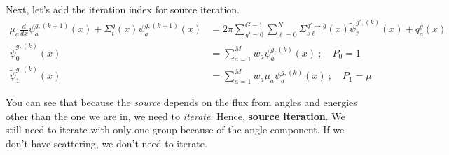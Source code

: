 \documentclass[12pt]{article}
\begin{document}
Next, let's add the iteration index for source iteration.  
\begin{align}
\mu_a \frac{d}{dx}\psi_{a}^{g, (k+1)}(x) + \Sigma_{t}^g(x) \psi_{a}^{g, (k+1)}(x) &= 2\pi \sum_{g'=0}^{G-1}
  \sum_{\ell=0}^N \Sigma_{s\ell}^{g'\rightarrow g}(x) \tilde{\psi}^{g', (k)}_\ell(x) + q_{a}^g(x)\\
\tilde{\psi}^{g, (k)}_0(x) &= \sum_{a=1}^M w_a \psi_a^{g, (k)}(x)\:; \quad P_0 = 1\\
\tilde{\psi}^{g, (k)}_1(x) &= \sum_{a=1}^M w_a \mu_a \psi_a^{g, (k)}(x)\:; \quad P_1 = \mu
\end{align}

You can see that because the \textit{source} depends on the flux from angles and energies other than the one we are in, we need to \textit{iterate}. Hence, \textbf{source iteration}. We still need to iterate with only one group because of the angle component. If we don't have scattering, we don't need to iterate. 
\end{document}

